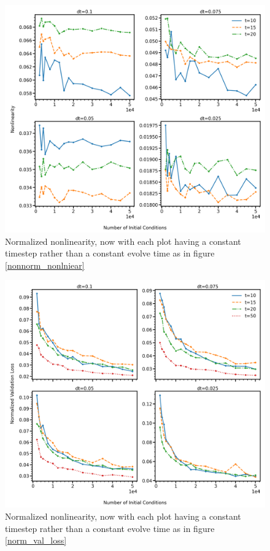 \documentclass[11pt]{article} %
\numberwithin{equation}{section}  %
\begin{document}
\begin{figure}
	\centering
	
	\includegraphics[width=\linewidth]{figures/nonnorm_nonlinearity_evolve_time}
	\caption{Normalized nonlinearity, now with each plot having a constant timestep rather than a constant evolve time as in figure \ref{nonnorm_nonlniear}}\label{nonnorm_nonlinear_evolve_time}
\end{figure}

\begin{figure}
	\centering
	
	\includegraphics[width=\linewidth]{figures/norm_val_loss_evolve_time}
	\caption{Normalized nonlinearity, now with each plot having a constant timestep rather than a constant evolve time as in figure \ref{norm_val_loss}}\label{norm_val_loss_evolve_time}
\end{figure}
\end{document}
